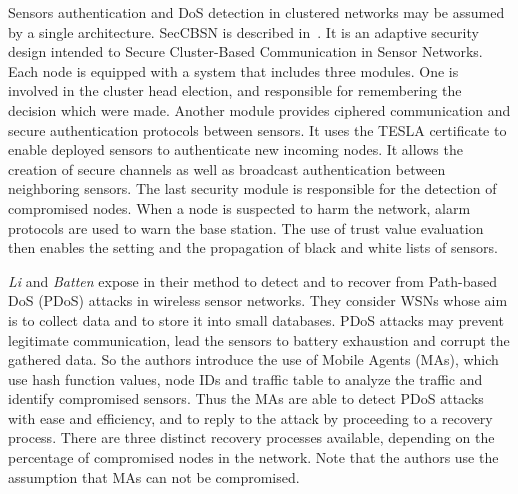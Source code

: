 Sensors authentication and DoS detection in clustered networks may be assumed by a single architecture.
SecCBSN is described in~\cite{HHC07}.
It is an adaptive security design intended to Secure Cluster-Based Communication in Sensor Networks.
Each node is equipped with a system that includes three modules.
One is involved in the cluster head election, and responsible for remembering the decision which were made.
Another module provides ciphered communication and secure authentication protocols between sensors.
It uses the TESLA certificate to enable deployed sensors to authenticate new incoming nodes.
It allows the creation of secure channels as well as broadcast authentication between neighboring sensors.
The last security module is responsible for the detection of compromised nodes.
When a node is suspected to harm the network, alarm protocols are used to warn the base station.
The use of trust value evaluation then enables the setting and the propagation of black and white lists of sensors.








\textit{Li} and \textit{Batten} expose in
\cite{LB09}
their method to detect and to recover from Path-based DoS (PDoS) attacks in wireless sensor networks.
They consider WSNs whose aim is to collect data and to store it into small databases.
PDoS attacks may prevent legitimate communication, lead the sensors to battery exhaustion and corrupt the gathered data.
So the authors introduce the use of Mobile Agents (MAs), which use hash function values, node IDs and traffic table to analyze the traffic and identify compromised sensors.
Thus the MAs are able to detect PDoS attacks with ease and efficiency, and to reply to the attack by proceeding to a recovery process.
There are three distinct recovery processes available, depending on the percentage of compromised nodes in the network.
Note that the authors use the assumption that MAs can not be compromised.


